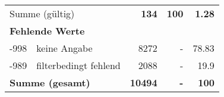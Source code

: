 \begin{longtable}{lXrrr}
     \midrule
     \multicolumn{2}{l}{Summe (gültig)} &
       \textbf{\num{134}} &
     \textbf{\num{100}} &
       \textbf{\num[round-mode=places,round-precision=2]{1.28}} \\
     \multicolumn{5}{l}{\textbf{Fehlende Werte}}\\
       -998 &
       keine Angabe &
         \num{8272} &
        - &
         \num[round-mode=places,round-precision=2]{78.83} \\
       -989 &
       filterbedingt fehlend &
         \num{2088} &
        - &
         \num[round-mode=places,round-precision=2]{19.9} \\
     \midrule
     \multicolumn{2}{l}{\textbf{Summe (gesamt)}} &
          \textbf{\num{10494}} &
        \textbf{-} &
        \textbf{\num{100}} \\
     \bottomrule
     \end{longtable}
     
